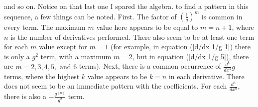 and so on. Notice on that last one I spared the algebra. to find a pattern in this sequence, a few things can be noted. First. The factor of $\left(\frac{1}{g}\right)^m$ is common in every term. The maximum $m$ value here appears to be equal to $m=n+1$, where $n$ is the number of derivatives performed. There also seem to be at least one term for each $m$ value except for $m=1$ (for example, in equation (\ref{d/dx 1/g 1}) there is only a $g^2$ term, with a maximum $m=2$, but in equation (\ref{d/dx 1/g 5}), there are $m=2,3,4,5,\text{ and }6$ terms). Next, there is a common occurrence of $\frac{d^k}{dx^k}g$ terms, where the highest $k$ value appears to be $k=n$ in each derivative. There does not seem to be an immediate pattern with the coefficients. For each $\frac{d^n}{dx^n}$, there is also a $-\frac{g^{(n)}}{g^2}$ term.

